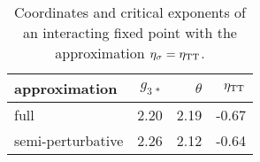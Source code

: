 \documentclass[11pt]{book} %
\numberwithin{equation}{chapter}
\begin{document}
\begin{table}
  \begin{center}
  \begin{tabular}{ l r r r }
    \toprule
    approximation     & $g_{3\,\ast}$ & $\theta$ & $\eta_{\rm TT}$ \\
    \midrule
    full              & 2.20          & 2.19     & -0.67 \\
    semi-perturbative & 2.26          & 2.12     & -0.64 \\
    \bottomrule
  \end{tabular}
  \end{center}
  \caption[Coordinates and critical exponents of fixed points]
  {
    Coordinates and critical exponents of an interacting fixed point with the
    approximation $\eta_{\sigma} = \eta_{\rm TT}$.
  }
  \label{puregravityFPetaapprox}
\end{table}
\end{document}
